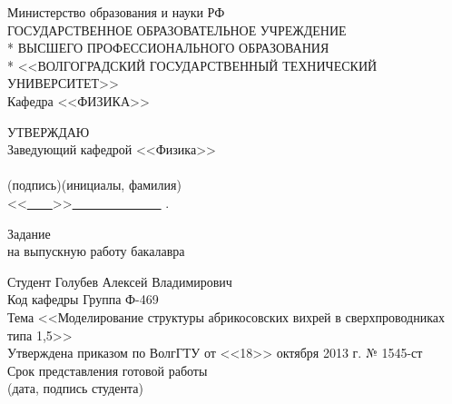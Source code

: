 \begin{titlepage}
	\begin{center}
		Министерство образования и науки РФ \\
		\vspace{.5cm}
		ГОСУДАРСТВЕННОЕ ОБРАЗОВАТЕЛЬНОЕ УЧРЕЖДЕНИЕ\\*
		ВЫСШЕГО ПРОФЕССИОНАЛЬНОГО ОБРАЗОВАНИЯ\\*
		<<ВОЛГОГРАДСКИЙ ГОСУДАРСТВЕННЫЙ ТЕХНИЧЕСКИЙ УНИВЕРСИТЕТ>>\\
		\vspace{.5cm}
		Кафедра <<ФИЗИКА>>
		\vspace{.5cm}
	\end{center}
	\begin{flushright}
		УТВЕРЖДАЮ\\
		Заведующий кафедрой <<Физика>>\\
		\vspace{.3cm}
		\underline{\hspace{2cm}}\hspace{1cm}\underline{\hspace{4cm}}\\
		\vspace{-.2cm}\footnotesize(подпись)\hspace{1.8cm}(инициалы, фамилия)
			\hspace*{.2cm}\ \normalsize\\
		\vspace{.3cm}
		<<\underline{\ \ \ \ }>>\underline{\ \ \ \ \ \ \ \ \ \ \ \ \ \ } 
			\the{}.
	\end{flushright}
	\begin{center}
		\large Задание \\
		\normalsize на выпускную работу бакалавра
	\end{center}
	\begin{flushleft}
		Студент Голубев Алексей Владимирович\\
		Код кафедры \underline{\hspace{3cm}}\hspace{6cm}Группа Ф-469\\
		Тема <<Моделирование структуры абрикосовских вихрей в сверхпроводниках 
		    типа 1,5>>\\
		Утверждена приказом по ВолгГТУ от <<18>> октября 2013 г. № 1545-ст\\
		Срок представления готовой работы \underline{\hspace{6cm}}\\
		\vspace{-.2cm}\hspace{9.5cm}\footnotesize(дата, подпись студента)

\end{flushleft}
\end{titlepage}
